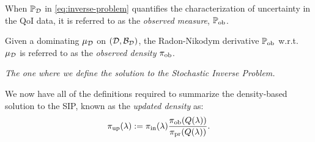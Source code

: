 \begin{frame}

\begin{defn}\label{defn:observed}
When $\mathbb{P}_{\mathcal{D}}$ in \eqref{eq:inverse-problem} quantifies the characterization of uncertainty in the QoI data, it is referred to as the \emph{observed measure}, $\operatorname*{\mathbb{P}_{ob}}$.

\bigskip
Given a dominating $\mu_{\mathcal{D}}$ on $(\mathcal{D}, \mathcal{B}_{\mathcal{D}})$, the Radon-Nikodym derivative $\operatorname*{\mathbb{P}_{ob}}$ w.r.t. $\mu_{\mathcal{D}}$ is referred to as the  \emph{observed density} $\operatorname*{\pi_{ob}}$.
\end{defn}

\end{frame}


\begin{frame}{\it The one where we define the solution to the Stochastic Inverse Problem.}

We now have all of the definitions required to summarize the density-based solution to the SIP, known as the \emph{updated density} as:
\vskip 10pt
\begin{equation}\label{eq:updated-pdf}
	\operatorname*{\pi_{up}}(\lambda) := \operatorname*{\pi_{in}}(\lambda)\frac{\operatorname*{\pi_{ob}}(Q(\lambda))}{\operatorname*{\pi_{pr}}(Q(\lambda))}.
\end{equation}

\end{frame}

